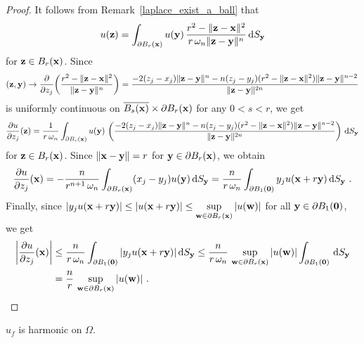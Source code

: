 \begin{proof}
It follows from Remark~\ref{laplace_exist_a_ball} that
\[
u(\VEC{z}) = \int_{\partial B_r(\VEC{x})} u(\VEC{y}) \,
\frac{r^2-\|\VEC{z}-\VEC{x}\|^2}{r\, \omega_n \|\VEC{z}-\VEC{y}\|^n} \dss{S}{y}
\]
for $\VEC{z} \in B_r(\VEC{x})$.  Since
\[
(\VEC{z},\VEC{y}) \to
\pdfdx{\left(\frac{r^2-\|\VEC{z}-\VEC{x}\|^2}
{\|\VEC{z}-\VEC{y}\|^n}\right)}{z_j}
= \frac{-2(z_j-x_j) \|\VEC{z}-\VEC{y}\|^n
- n (z_j-y_j)(r^2 - \|\VEC{z}-\VEC{x}\|^2)
\|\VEC{z}-\VEC{y}\|^{n-2}}{\|\VEC{z}-\VEC{y}\|^{2n}}
\]
is uniformly continuous on
$\overline{B_s(\VEC{x})} \times \partial B_r(\VEC{x})$ for any $0<s<r$,
we get
\[
\pdydx{u}{z_j}(\VEC{z}) = \frac{1}{r\,\omega_n}
\int_{\partial B_r(\VEC{x})} u(\VEC{y}) \,
\left( \frac{-2(z_j-x_j) \|\VEC{z}-\VEC{y}\|^n
- n(z_j-y_j) (r^2 - \|\VEC{z}-\VEC{x}\|^2)
\|\VEC{z}-\VEC{y}\|^{n-2}}{\|\VEC{z}-\VEC{y}\|^{2n}} \right) \dss{S}{y}
\]
for $\VEC{z} \in B_r(\VEC{x})$.  Since
$\|\VEC{x}-\VEC{y}\| = r$ for $\VEC{y}\in \partial B_r(\VEC{x})$, we obtain
\[
\pdydx{u}{z_j}(\VEC{x}) = -\frac{n}{r^{n+1}\,\omega_n}
\int_{\partial B_r(\VEC{x})} (x_j-y_j) u(\VEC{y}) \dss{S}{y}
= \frac{n}{r\,\omega_n}
\int_{\partial B_1(\VEC{0})} y_j u(\VEC{x} + r\VEC{y}) \dss{S}{y} \ .
\]
Finally, since
$\displaystyle
| y_j u(\VEC{x} + r\VEC{y}) | \leq
|u(\VEC{x} + r\VEC{y}) | \leq \sup_{\VEC{w}\in \partial B_r(\VEC{x})} |u(\VEC{w})|$
for all $\VEC{y} \in \partial B_1(\VEC{0})$, we get
\begin{align*}
\left|\pdydx{u}{z_j}(\VEC{x})\right|
& \leq \frac{n}{r\,\omega_n}
\int_{\partial B_1(\VEC{0})} |y_j u(\VEC{x} + r\VEC{y})| \dss{S}{y}
\leq \frac{n}{r\,\omega_n}\,\sup_{\VEC{w}\in \partial B_r(\VEC{x})} |u(\VEC{w})|
\int_{\partial B_1(\VEC{0})} \dss{S}{y} \\
&= \frac{n}{r}\,\sup_{\VEC{w}\in \partial B_r(\VEC{x})} |u(\VEC{w})| \ . \qedhere 
\end{align*}
\end{proof}

\begin{lemma} \label{PerronLem7}
$u_f$ is harmonic on $\Omega$.
\end{lemma}

